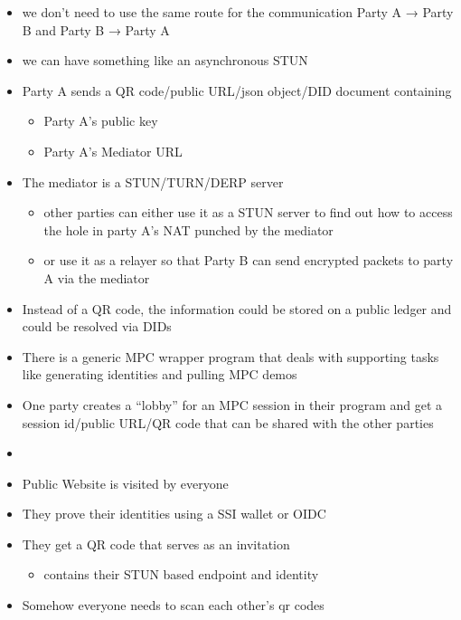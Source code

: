 \begin{frame}
\begin{itemize}
\tightlist
\item
  we don't need to use the same route for the communication Party A →
  Party B and Party B → Party A
\item
  we can have something like an asynchronous STUN
\item
  Party A sends a QR code/public URL/json object/DID document containing

  \begin{itemize}
  \tightlist
  \item
    Party A's public key
  \item
    Party A's Mediator URL
  \end{itemize}
\item
  The mediator is a STUN/TURN/DERP server

  \begin{itemize}
  \tightlist
  \item
    other parties can either use it as a STUN server to find out how to
    access the hole in party A's NAT punched by the mediator
  \item
    or use it as a relayer so that Party B can send encrypted packets to
    party A via the mediator
  \end{itemize}
\item
  Instead of a QR code, the information could be stored on a public
  ledger and could be resolved via DIDs
\end{itemize}
\end{frame}

\begin{frame}
\begin{itemize}
\tightlist
\item
  There is a generic MPC wrapper program that deals with supporting
  tasks like generating identities and pulling MPC demos
\item
  One party creates a ``lobby'' for an MPC session in their program and
  get a session id/public URL/QR code that can be shared with the other
  parties
\item
\end{itemize}
\end{frame}

\begin{frame}
\begin{itemize}
\tightlist
\item
  Public Website is visited by everyone
\item
  They prove their identities using a SSI wallet or OIDC
\item
  They get a QR code that serves as an invitation

  \begin{itemize}
  \tightlist
  \item
    contains their STUN based endpoint and identity
  \end{itemize}
\item
  Somehow everyone needs to scan each other's qr codes
\end{itemize}
\end{frame}

